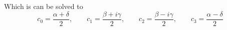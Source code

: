 \documentclass[a4paper,german,12pt,smallheadings]{scrartcl}
\begin{document}
\begin{enumerate}[a)]
    Which is can be solved to
    \begin{equation*}
      c_0 = \frac{\alpha + \delta}{2}, \qquad
      c_1 = \frac{\beta + i \gamma}{2}, \qquad
      c_2 = \frac{\beta - i \gamma}{2}, \qquad
      c_3 = \frac{\alpha - \delta}{2}
    \end{equation*}

\end{enumerate}
\end{document}
